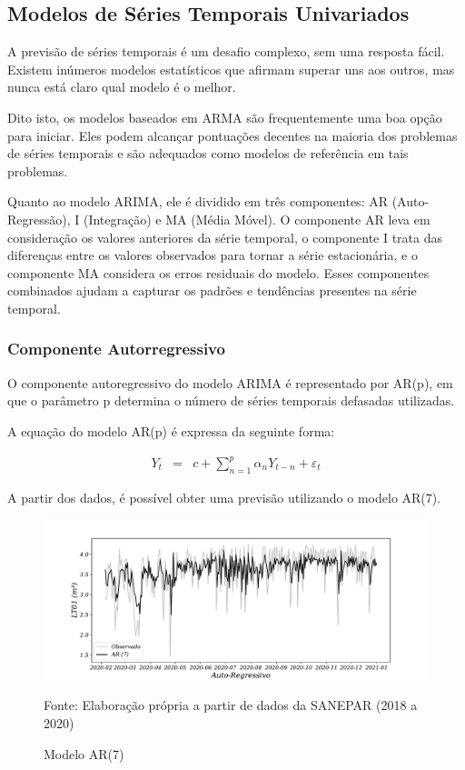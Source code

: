\subsection{Modelos de S\'eries Temporais Univariados}\label{subsec:arima}

A previsão de séries temporais é um desafio complexo, sem uma resposta fácil. Existem inúmeros modelos estatísticos que afirmam superar uns aos outros, mas nunca está claro qual modelo é o melhor.

Dito isto, os modelos baseados em ARMA são frequentemente uma boa opção para iniciar. Eles podem alcançar pontuações decentes na maioria dos problemas de séries temporais e são adequados como modelos de referência em tais problemas.

Quanto ao modelo ARIMA, ele é dividido em três componentes: AR (Auto-Regressão), I (Integração) e MA (Média Móvel). O componente AR leva em consideração os valores anteriores da série temporal, o componente I trata das diferenças entre os valores observados para tornar a série estacionária, e o componente MA considera os erros residuais do modelo. Esses componentes combinados ajudam a capturar os padrões e tendências presentes na série temporal.

\subsubsection{Componente Autorregressivo}

O componente autoregressivo do modelo ARIMA é representado por AR(p), em que o parâmetro p determina o número de séries temporais defasadas utilizadas.

A equação do modelo AR(p) é expressa da seguinte forma:

\begin{eqnarray}
	Y_t&=&c+\sum_{n=1}^{p} \alpha_n Y_{t-n} + \varepsilon_t\label{AR}
\end{eqnarray}

A partir dos dados, é possível obter uma previsão utilizando o modelo AR(7).

\begin{figure}[H]
	\centering
	\caption{Modelo AR(7)  }
	\label{fig:1-ar}
	\includegraphics[width=0.9\linewidth]{Modelos/Figuras/0-AR}
	
	Fonte: Elaboração própria a partir de dados da SANEPAR (2018 a 2020)
\end{figure}

